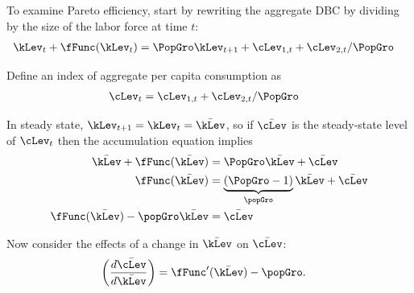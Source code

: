 \documentclass{handout}
\begin{document}
To examine Pareto efficiency, start by rewriting the aggregate DBC by
dividing by the size of the labor force at time $t$:
\begin{equation}\begin{gathered}\begin{aligned}
  \label{eq:5}
  \kLev_{t} + \fFunc(\kLev_{t}) & =  \PopGro \kLev_{t+1} + \cLev_{1,t} + \cLev_{2,t}/\PopGro
\end{aligned}\end{gathered}\end{equation}

Define an index of aggregate per capita consumption as 
\begin{equation}\begin{gathered}\begin{aligned}
  \label{eq:6}
  \cLev_{t} & =  \cLev_{1,t} + \cLev_{2,t}/\PopGro
\end{aligned}\end{gathered}\end{equation}

In steady state, $\kLev_{t+1}=\kLev_{t}=\bar{\kLev}$, so if $\bar{\cLev}$ is the steady-state level of 
$\cLev_{t}$ then the accumulation equation
implies
\begin{equation}\begin{gathered}\begin{aligned}
  \bar{\kLev} + \fFunc(\bar{\kLev}) & =  \PopGro \bar{\kLev} + \bar{\cLev}
\\ \fFunc(\bar{\kLev}) & =  \underbrace{(\PopGro-1)}_{\popGro}\bar{\kLev}+\bar{\cLev}
\\ \fFunc(\bar{\kLev})-\popGro \bar{\kLev} & =  \bar{\cLev}
\end{aligned}\end{gathered}\end{equation}

Now consider the effects of a change in $\bar{\kLev}$ on $\bar{\cLev}$:
\begin{equation}\begin{gathered}\begin{aligned}
  \left(\frac{d \bar{\cLev}}{d \bar{\kLev}}\right) & =  \fFunc^{\prime}(\bar{\kLev})-\popGro.
\end{aligned}\end{gathered}\end{equation}
\end{document}
